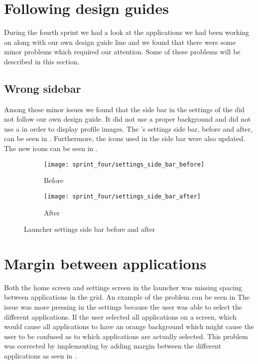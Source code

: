 
\section{Following design guides}
\label{sec:following_design_guides}
During the fourth sprint we had a look at the applications we had been working on along with our own design guide line and we found that there were some minor problems which required our attention. Some of these problems will be described in this section.

\subsection{Wrong sidebar}
\label{sec:wrong_sidebar}
Among these minor issues we found that the side bar in the settings of the \launcher did not follow our own design guide. It did not use a proper background and did not use a  in order to display profile images. The \launcher's settings side bar, before and after, can be seen in . Furthermore, the icons used in the side bar were also updated. The new icons can be seen in .

\begin{figure}[!htbp]
    \centering

    \begin{subfigure}[t]{0.3\textwidth}
        \texttt{[image: sprint\_four/settings\_side\_bar\_before]}
        \caption{Before}
        \label{fig:launcher_settings_side_bar_before}
    \end{subfigure}
    \hspace{5em} 
    \begin{subfigure}[t]{0.3\textwidth}
        \texttt{[image: sprint\_four/settings\_side\_bar\_after]}
        \caption{After}
        \label{fig:launcher_settings_side_bar_after}
    \end{subfigure}
    
    \caption{Launcher settings side bar before and after}
    \label{fig:launcher_settings_side_bar_before_and_after}
\end{figure}


\section{Margin between applications}
\label{sec:margin_between_applications}
Both the home screen and settings screen in the launcher was missing spacing between applications in the grid. An example of the problem can be seen in  The issue was more pressing in the settings because the user was able to select the different applications. If the user selected all applications on a screen, which would cause all applications to have an orange background which might cause the user to be confused as to which applications are actually selected. This problem was corrected by implementing by adding margin between the different applications as seen in .  


